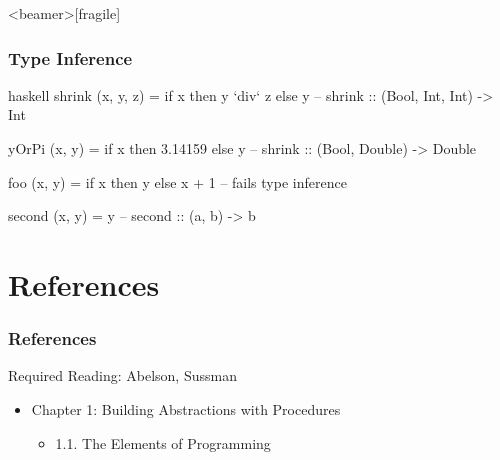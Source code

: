 \documentclass[dvipsnames]{beamer}
\theoremstyle{plain}
\begin{document}
\begin{frame}<beamer>[fragile]
  \frametitle{Type Inference}

  \begin{example}[Haskell]
    \begin{pygments}{haskell}
shrink (x, y, z) = if x then y `div` z else y
-- shrink :: (Bool, Int, Int) -> Int

yOrPi (x, y) = if x then 3.14159 else y
-- shrink :: (Bool, Double) -> Double

foo (x, y) = if x then y else x + 1
-- fails type inference

second (x, y) = y
-- second :: (a, b) -> b
    \end{pygments}
  \end{example}
\end{frame}

\section*{References}

\begin{frame}
  \frametitle{References}

  \begin{block}{Required Reading: Abelson, Sussman}
    \begin{itemize}
      \item Chapter 1: Building Abstractions with Procedures
      \begin{itemize}
        \item 1.1. \alert{The Elements of Programming}
      \end{itemize}
    \end{itemize}
  \end{block}
\end{frame}
\end{document}
